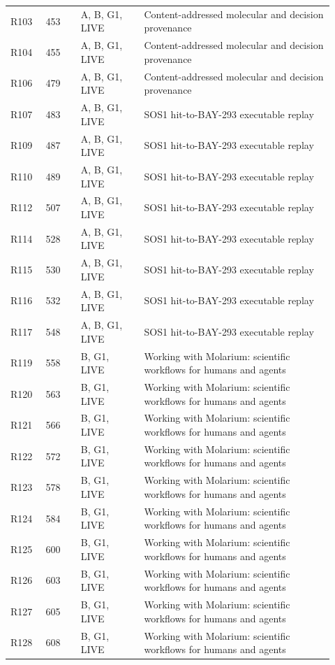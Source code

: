 \documentclass[11pt]{article}
\begin{document}
\begin{longtable}{@{}p{0.10\linewidth}p{0.10\linewidth}p{0.18\linewidth}p{0.54\linewidth}@{}}
R103 & 453 & A, B, G1, LIVE & Content-addressed molecular and decision provenance \\
R104 & 455 & A, B, G1, LIVE & Content-addressed molecular and decision provenance \\
R106 & 479 & A, B, G1, LIVE & Content-addressed molecular and decision provenance \\
R107 & 483 & A, B, G1, LIVE & SOS1 hit-to-BAY-293 executable replay \\
R109 & 487 & A, B, G1, LIVE & SOS1 hit-to-BAY-293 executable replay \\
R110 & 489 & A, B, G1, LIVE & SOS1 hit-to-BAY-293 executable replay \\
R112 & 507 & A, B, G1, LIVE & SOS1 hit-to-BAY-293 executable replay \\
R114 & 528 & A, B, G1, LIVE & SOS1 hit-to-BAY-293 executable replay \\
R115 & 530 & A, B, G1, LIVE & SOS1 hit-to-BAY-293 executable replay \\
R116 & 532 & A, B, G1, LIVE & SOS1 hit-to-BAY-293 executable replay \\
R117 & 548 & A, B, G1, LIVE & SOS1 hit-to-BAY-293 executable replay \\
R119 & 558 & B, G1, LIVE & Working with Molarium: scientific workflows for humans and agents \\
R120 & 563 & B, G1, LIVE & Working with Molarium: scientific workflows for humans and agents \\
R121 & 566 & B, G1, LIVE & Working with Molarium: scientific workflows for humans and agents \\
R122 & 572 & B, G1, LIVE & Working with Molarium: scientific workflows for humans and agents \\
R123 & 578 & B, G1, LIVE & Working with Molarium: scientific workflows for humans and agents \\
R124 & 584 & B, G1, LIVE & Working with Molarium: scientific workflows for humans and agents \\
R125 & 600 & B, G1, LIVE & Working with Molarium: scientific workflows for humans and agents \\
R126 & 603 & B, G1, LIVE & Working with Molarium: scientific workflows for humans and agents \\
R127 & 605 & B, G1, LIVE & Working with Molarium: scientific workflows for humans and agents \\
R128 & 608 & B, G1, LIVE & Working with Molarium: scientific workflows for humans and agents \\

\end{longtable}
\end{document}
